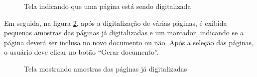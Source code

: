 \begin{figure}[h]
 \centering
    \setlength\fboxsep{0pt}
    \setlength\fboxrule{0.5pt}
  \caption {Tela indicando que uma página está sendo digitalizada}
  \label{fig:dig_4}
\end{figure}

Em seguida, na figura \ref{fig:dig_5}, após a digitalização de várias páginas, é exibida pequenas amostras das páginas já digitalizadas e um marcador, indicando se a página deverá ser inclusa no novo documento ou não. Após a seleção das páginas, o usuário deve clicar no botão ``Gerar documento''.

\begin{figure}[h]
 \centering
    \setlength\fboxsep{0pt}
    \setlength\fboxrule{0.5pt}
  \caption {Tela mostrando amostras das páginas já digitalizadas}
  \label{fig:dig_5}
\end{figure}

